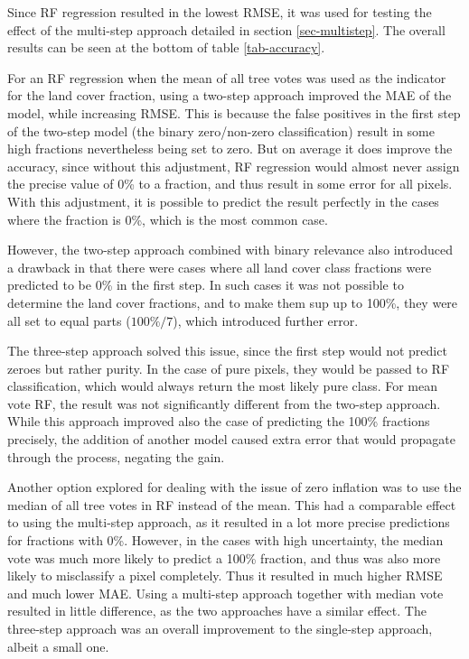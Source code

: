 \documentclass[a4paper,10pt]{article}
\begin{document}
Since \gls{RF} regression resulted in the lowest RMSE, it was used for testing the effect of the multi-step approach detailed in section \ref{sec-multistep}.
The overall results can be seen at the bottom of table \ref{tab-accuracy}.

For an \gls{RF} regression when the mean of all tree votes was used as the indicator for the land cover fraction, using a two-step approach improved the \gls{MAE} of the model, while increasing \gls{RMSE}.
This is because the false positives in the first step of the two-step model (the binary zero/non-zero classification) result in some high fractions nevertheless being set to zero.
But on average it does improve the accuracy, since without this adjustment, \gls{RF} regression would almost never assign the precise value of 0\% to a fraction, and thus result in some error for all pixels.
With this adjustment, it is possible to predict the result perfectly in the cases where the fraction is 0\%, which is the most common case.

However, the two-step approach combined with binary relevance also introduced a drawback in that there were cases where all land cover class fractions were predicted to be 0\% in the first step.
In such cases it was not possible to determine the land cover fractions, and to make them sup up to 100\%, they were all set to equal parts ($100\% / 7$), which introduced further error.

The three-step approach solved this issue, since the first step would not predict zeroes but rather purity.
In the case of pure pixels, they would be passed to \gls{RF} classification, which would always return the most likely pure class.
For mean vote \gls{RF}, the result was not significantly different from the two-step approach.
While this approach improved also the case of predicting the 100\% fractions precisely, the addition of another model caused extra error that would propagate through the process, negating the gain.

Another option explored for dealing with the issue of zero inflation was to use the median of all tree votes in \gls{RF} instead of the mean.
This had a comparable effect to using the multi-step approach, as it resulted in a lot more precise predictions for fractions with 0\%.
However, in the cases with high uncertainty, the median vote was much more likely to predict a 100\% fraction, and thus was also more likely to misclassify a pixel completely.
Thus it resulted in much higher \gls{RMSE} and much lower \gls{MAE}.
Using a multi-step approach together with median vote resulted in little difference, as the two approaches have a similar effect.
The three-step approach was an overall improvement to the single-step approach, albeit a small one.
\end{document}
